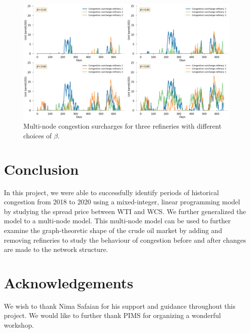 \documentclass[11pt]{m2pi}
\begin{document}
\begin{figure}[h!]
	\centering
	\includegraphics[width=\linewidth]{multinode with beta.png}
	\caption{Multi-node congestion surcharges for three refineries with different choices of $\beta$.}\label{fig:minipage1}
\end{figure}



\section{Conclusion}
In this project, we were able to successfully identify periods of historical congestion from 2018 to 2020 using a mixed-integer, linear programming model by studying the spread price between WTI and WCS. We further generalized the model to a multi-node model. This multi-node model can be used to further examine the graph-theoretic shape of the crude oil market by adding and removing refineries to study the behaviour of congestion before and after changes are made to the network structure.
\section*{Acknowledgements}
We wish to thank Nima Safaian for his support and guidance throughout this project. We would like to further thank PIMS for organizing a wonderful workshop.


\end{document}
